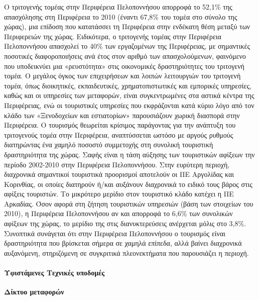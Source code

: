 \documentclass[12pt]{article}
\begin{document}
	Ο τριτογενής τομέας στην Περιφέρεια Πελοποννήσου απορροφά το 52,1\% της απασχόλησης στη Περιφέρεια το 2010 (έναντι 67,8\% του τομέα στο σύνολο της χώρας), μια επίδοση που κατατάσσει τη Περιφέρεια στην ενδέκατη θέση μεταξύ των Περιφερειών της χώρας. Ειδικότερα, ο τριτογενής τομέας στην Περιφέρεια Πελοποννήσου απασχολεί το 40\% των εργαζομένων της Περιφέρειας, με σημαντικές ποσοτικές διαφοροποιήσεις ανά έτος στον αριθμό των απασχολούμενων, φαινόμενο που υποδεικνύει μια «ρευστότητα» στις οικονομικές δραστηριότητες του τριτογενή τομέα. Ο μεγάλος όγκος των επιχειρήσεων και λοιπών λειτουργιών του τριτογενή τομέα, όπως διοικητικές, εκπαιδευτικές, χρηματοπιστωτικές και εμπορικές υπηρεσίες, καθώς και οι υπηρεσίες των μεταφορών, είναι συγκεντρωμένες στα αστικά κέντρα της Περιφέρειας, ενώ οι τουριστικές υπηρεσίες που εκφράζονται κατά κύριο λόγο από τον κλάδο των «Ξενοδοχείων και εστιατορίων» παρουσιάζουν χωρική διασπορά στην Περιφέρεια. Ο τουρισμός θεωρείται κρίσιμος παράγοντας για την ανάπτυξη του τριτογενούς τομέα στην Περιφέρεια, αναπτύσσεται ωστόσο με αργούς ρυθμούς διατηρώντας ένα χαμηλό ποσοστό συμμετοχής στη συνολική τουριστική δραστηριότητα της χώρας. Σαφής είναι η τάση αύξησης των τουριστικών αφίξεων την περίοδο 2002-2010 στην Περιφέρεια Πελοποννήσου. Στην ευρύτερη περιοχή, διαχρονικά σημαντικοί τουριστικά προορισμοί αποτελούν οι ΠΕ Αργολίδας και Κορινθίας, οι οποίες διατηρούν ή/και αυξάνουν διαχρονικά το ειδικό τους βάρος στις αφίξεις τουριστών. Το μικρότερο μερίδιο στον τουριστικό κλάδο κατέχει η ΠΕ Αρκαδίας. Όσον αφορά στη ζήτηση τουριστικών υπηρεσιών (βάση των στοιχείων του 2010), η Περιφέρεια Πελοποννήσου αν και απορροφά το 6,6\% των συνολικών αφίξεων της χώρας, το μερίδιο της στις διανυκτερεύσεις ανέρχεται μόλις στο 3,8\%. Συνοπτικά συνάγεται ότι στην Περιφέρεια Πελοποννήσου ο τουρισμός είναι δραστηριότητα που βρίσκεται σήμερα σε χαμηλά επίπεδα, αλλά βαίνει διαχρονικά αυξανόμενη, στηριζόμενη σε συγκριτικά πλεονεκτήματα που παρουσιάζει η περιοχή.  
	
	\paragraph{Υφιστάμενες Τεχνικές υποδομές}
	
	\textbf{Δίκτυο μεταφορών}
	
\end{document}
